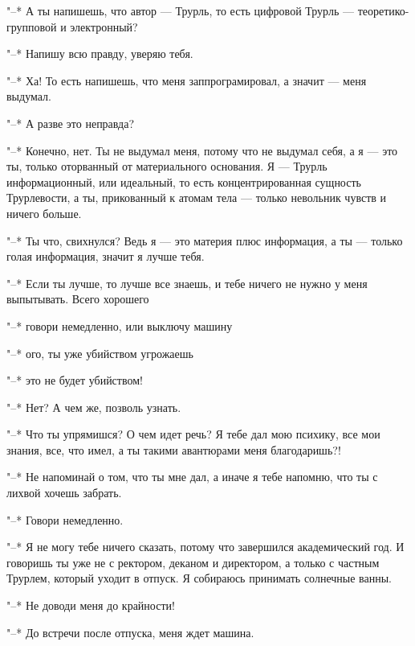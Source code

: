 "--* А ты напишешь, что автор --- Трурль, то есть цифровой
Трурль --- теоретико-групповой и электронный?

"--* Напишу всю правду, уверяю тебя.

"--* Ха! То есть напишешь, что меня заппрограмировал, а
значит --- меня выдумал.

"--* А разве это неправда?

"--* Конечно, нет. Ты не выдумал меня, потому что не
выдумал себя, а я --- это ты, только оторванный от
материального основания. Я --- Трурль информационный, или
идеальный, то есть концентрированная сущность Трурлевости, а
ты, прикованный к атомам тела --- только невольник чувств и
ничего больше.

"--* Ты что, свихнулся? Ведь я --- это материя плюс
информация, а ты --- только голая информация, значит я лучше
тебя.

"--* Если ты лучше, то лучше все знаешь, и тебе ничего не
нужно у меня выпытывать. Всего хорошего

"--* говори немедленно, или выключу машину

"--* ого, ты уже убийством угрожаешь

"--* это не будет убийством!

"--* Нет? А чем же, позволь узнать.

"--* Что ты упрямишся? О чем идет речь? Я тебе дал мою
психику, все мои знания, все, что имел, а ты такими
авантюрами меня благодаришь?!

"--* Не напоминай о том, что ты мне дал, а иначе я тебе
напомню, что ты с лихвой хочешь забрать.

"--* Говори немедленно.

"--* Я не могу тебе ничего сказать, потому что завершился
академический год. И говоришь ты уже не с ректором, деканом
и директором, а только с частным Трурлем, который уходит в
отпуск. Я собираюсь принимать солнечные ванны.

"--* Не доводи меня до крайности!

"--* До встречи после отпуска, меня ждет машина.

